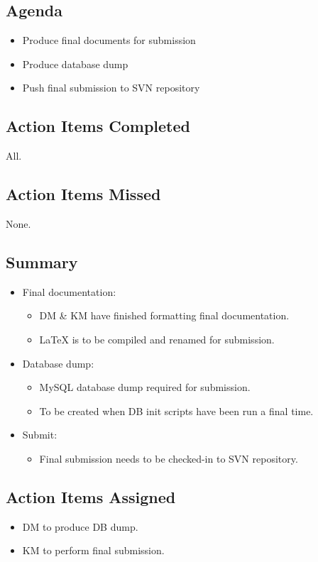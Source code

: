 \documentclass{article}
\begin{document}
\subsection*{Agenda}
\begin{itemize}
\item Produce final documents for submission
\item Produce database dump
\item Push final submission to SVN repository
\end{itemize}

\subsection*{Action Items Completed}
All.

\subsection*{Action Items Missed}
None.

\subsection*{Summary}
\begin{itemize}
\item Final documentation:
  \begin{itemize}
  \item DM \& KM have finished formatting final documentation.
  \item LaTeX is to be compiled and renamed for submission.
  \end{itemize}
\item Database dump:
  \begin{itemize}
  \item MySQL database dump required for submission.
  \item To be created when DB init scripts have been run a final time.
  \end{itemize}
\item Submit:
  \begin{itemize}
  \item Final submission needs to be checked-in to SVN repository.
  \end{itemize}
\end{itemize}

\subsection*{Action Items Assigned}
\begin{itemize}
\item DM to produce DB dump.
\item KM to perform final submission.
\end{itemize}
\end{document}
